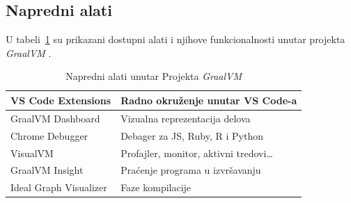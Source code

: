 \documentclass[a4paper]{article}
\begin{document}
\subsection{Napredni alati}
\label{sub:alati}

U tabeli~\ref{alati} su prikazani dostupni alati i njihove funkcionalnosti unutar projekta \emph{GraalVM} \cite{graalvm}.

\begin{table}
    \centering
    \begin{tabular}{|l|l|}
        \hline
        VS Code Extensions & Radno okruženje unutar VS Code-a\\
        \hline
        GraalVM Dashboard & Vizualna reprezentacija delova\\
        \hline
        Chrome Debugger & Debager za JS, Ruby, R i Python\\
        \hline
        VisualVM & Profajler, monitor, aktivni tredovi\ldots\\
        \hline
        GraalVM Insight & Praćenje programa u izvršavanju\\
        \hline
        Ideal Graph Visualizer & Faze kompilacije\\
        \hline
    \end{tabular}
    \caption{Napredni alati unutar Projekta \emph{GraalVM}}
    \label{alati}
\end{table}
\end{document}
